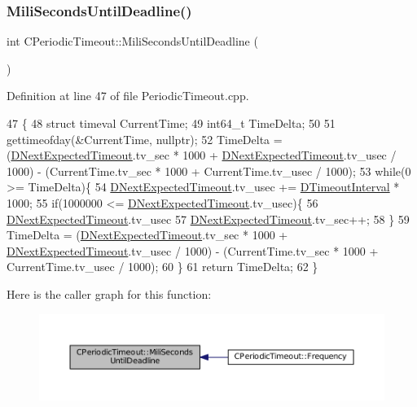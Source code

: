\subsubsection{\texorpdfstring{Mili\+Seconds\+Until\+Deadline()}{MiliSecondsUntilDeadline()}}
{\footnotesize\ttfamily int C\+Periodic\+Timeout\+::\+Mili\+Seconds\+Until\+Deadline (\begin{DoxyParamCaption}{ }\end{DoxyParamCaption})}



Definition at line 47 of file Periodic\+Timeout.\+cpp.


\begin{DoxyCode}
47                                               \{
48     \textcolor{keyword}{struct }timeval CurrentTime;
49     int64\_t TimeDelta;
50     
51     gettimeofday(&CurrentTime, \textcolor{keyword}{nullptr});
52     TimeDelta = (\hyperlink{classCPeriodicTimeout_ae85c3dd7526ee6b538b7c6478133013c}{DNextExpectedTimeout}.tv\_sec * 1000 + 
      \hyperlink{classCPeriodicTimeout_ae85c3dd7526ee6b538b7c6478133013c}{DNextExpectedTimeout}.tv\_usec / 1000) - (CurrentTime.tv\_sec * 1000 + CurrentTime.tv\_usec
       / 1000);
53     \textcolor{keywordflow}{while}(0 >= TimeDelta)\{
54         \hyperlink{classCPeriodicTimeout_ae85c3dd7526ee6b538b7c6478133013c}{DNextExpectedTimeout}.tv\_usec += \hyperlink{classCPeriodicTimeout_ab0c2b821c02366c9638a66eced3c1f34}{DTimeoutInterval} * 1000;
55         \textcolor{keywordflow}{if}(1000000 <= \hyperlink{classCPeriodicTimeout_ae85c3dd7526ee6b538b7c6478133013c}{DNextExpectedTimeout}.tv\_usec)\{
56             \hyperlink{classCPeriodicTimeout_ae85c3dd7526ee6b538b7c6478133013c}{DNextExpectedTimeout}.tv\_usec %
57             \hyperlink{classCPeriodicTimeout_ae85c3dd7526ee6b538b7c6478133013c}{DNextExpectedTimeout}.tv\_sec++;
58         \}
59         TimeDelta = (\hyperlink{classCPeriodicTimeout_ae85c3dd7526ee6b538b7c6478133013c}{DNextExpectedTimeout}.tv\_sec * 1000 + 
      \hyperlink{classCPeriodicTimeout_ae85c3dd7526ee6b538b7c6478133013c}{DNextExpectedTimeout}.tv\_usec / 1000) - (CurrentTime.tv\_sec * 1000 + CurrentTime.tv\_usec
       / 1000);
60     \}
61     \textcolor{keywordflow}{return} TimeDelta;
62 \}
\end{DoxyCode}
Here is the caller graph for this function\+:
\nopagebreak
\begin{figure}[H]
\begin{center}
\leavevmode
\includegraphics[width=350pt]{classCPeriodicTimeout_a5d32d0a29ba5efa718f3489cb9fb2340_icgraph}
\end{center}
\end{figure}


